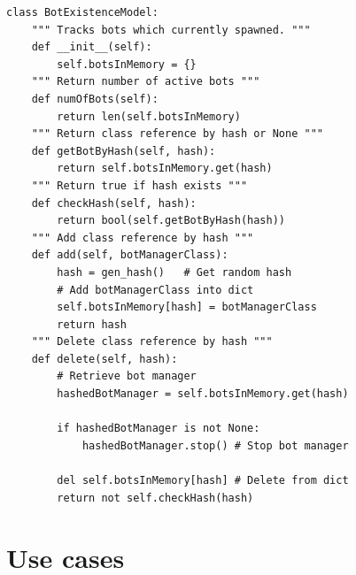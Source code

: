 \begin{code}
\label{code:impl:bot:existence_model}
\begin{verbatim}
class BotExistenceModel:
    """ Tracks bots which currently spawned. """
    def __init__(self):
        self.botsInMemory = {}
    """ Return number of active bots """
    def numOfBots(self):
        return len(self.botsInMemory)
    """ Return class reference by hash or None """
    def getBotByHash(self, hash):
        return self.botsInMemory.get(hash)
    """ Return true if hash exists """
    def checkHash(self, hash):
        return bool(self.getBotByHash(hash))
    """ Add class reference by hash """
    def add(self, botManagerClass):
        hash = gen_hash()   # Get random hash
        # Add botManagerClass into dict
        self.botsInMemory[hash] = botManagerClass
        return hash
    """ Delete class reference by hash """
    def delete(self, hash):
        # Retrieve bot manager
        hashedBotManager = self.botsInMemory.get(hash)
        
        if hashedBotManager is not None:
            hashedBotManager.stop() # Stop bot manager
            
        del self.botsInMemory[hash] # Delete from dict
        return not self.checkHash(hash)
\end{verbatim}
\end{code}

\newpage
\section{Use cases}

